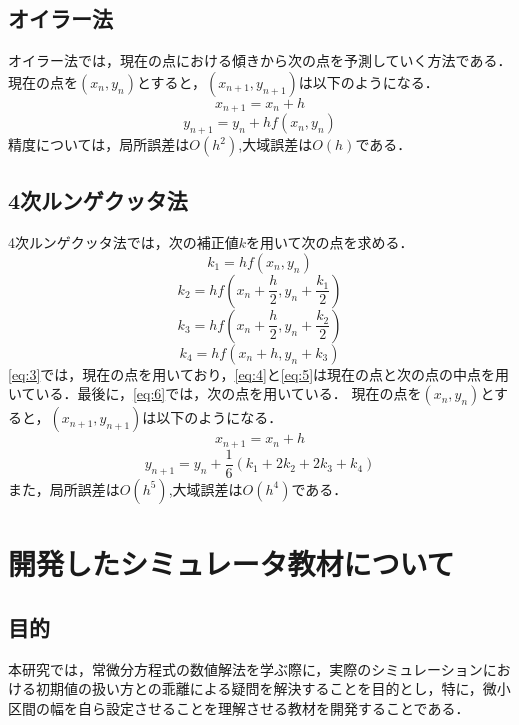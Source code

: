 \documentclass[a4paper, 12pt]{ltjsarticle}
\begin{document}
\subsection{オイラー法}
オイラー法では，現在の点における傾きから次の点を予測していく方法である．現在の点を$(x_n,y_n)$とすると，$(x_{n+1},y_{n+1})$は以下のようになる．
\begin{equation}
  x_{n+1}=x_n+h
\end{equation}
\begin{equation}
  y_{n+1}=y_n+hf(x_n,y_n)
\end{equation}
精度については，局所誤差は$O(h^2)$,大域誤差は$O(h)$である．
\clearpage
\subsection{4次ルンゲクッタ法}
4次ルンゲクッタ法では，次の補正値$k$を用いて次の点を求める．
\begin{equation}
  k_1=hf(x_n,y_n)\label{eq:3}
\end{equation}
\begin{equation}
  k_2=hf(x_n+\frac{h}{2},y_n+\frac{k_1}{2})\label{eq:4}
\end{equation}
\begin{equation}
  k_3=hf(x_n+\frac{h}{2},y_n+\frac{k_2}{2})\label{eq:5}
\end{equation}
\begin{equation}
  k_4=hf(x_n+h,y_n+k_3)\label{eq:6}
\end{equation}
\eqref{eq:3}では，現在の点を用いており，\eqref{eq:4}と\eqref{eq:5}は現在の点と次の点の中点を用いている．最後に，\eqref{eq:6}では，次の点を用いている．
現在の点を$(x_n,y_n)$とすると，$(x_{n+1},y_{n+1})$は以下のようになる．
\begin{equation}
  x_{n+1}=x_n+h
\end{equation}
\begin{equation}
  y_{n+1}=y_n+\frac{1}{6}(k_1+2k_2+2k_3+k_4)
\end{equation}
また，局所誤差は$O(h^5)$,大域誤差は$O(h^4)$である．
\clearpage
\section{開発したシミュレータ教材について}
\subsection{目的}
本研究では，常微分方程式の数値解法を学ぶ際に，実際のシミュレーションにおける初期値の扱い方との乖離による疑問を解決することを目的とし，特に，微小区間の幅を自ら設定させることを理解させる教材を開発することである．
\end{document}
